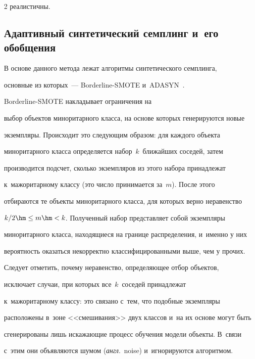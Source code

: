 \begin{multicols}{2}
реалистичны.

  

  


  

  \subsection{Адаптивный синтетический семплинг и~его обобщения}

  

  В основе данного метода лежат алгоритмы синтетического семплинга, 

основные из которых~--- Borderline-SMOTE и~ADASYN~\cite{6-sev, 7-sev}.

 Borderline-SMOTE накладывает ограничения на 

выбор \mbox{объектов} миноритарного класса, на основе которых генерируются новые 

экземпляры. Происходит это следующим образом: для каждого объекта 

миноритарного класса определяется набор~$k$~ближайших соседей, затем 

производится подсчет, сколько экземпляров из этого набора принадлежат 

к~мажоритарному классу (это число принимается за~$m$). После этого 

отбираются те объекты миноритарного класса, для которых верно неравенство  

  $k/2\hm\leq m\hm<k$. Полученный набор представляет собой экземпляры 

миноритарного класса, находящиеся на границе распределения, и~именно у них 

вероятность оказаться некорректно классифицированными выше, чем у прочих. 

Следует отметить, почему неравенство, определяющее отбор объектов, 

исключает случаи, при которых все~$k$~соседей принадлежат 

к~мажоритарному классу: это связано с~тем, что подобные экземпляры 

расположены в~зоне <<смешивания>> двух классов и~на их основе могут быть 

сгенерированы лишь искажающие процесс обучения модели объекты. В~связи 

с~этим они объявляются шумом (\textit{англ}.\ noise) и~игнорируются алгоритмом. 

  


\end{multicols}
